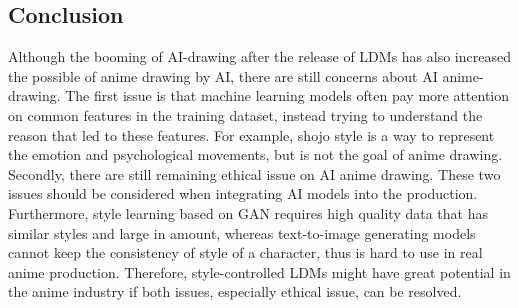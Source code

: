\subsection*{Conclusion}

Although the booming of AI-drawing after the release of LDMs has also increased
the possible of anime drawing by AI,
there are still concerns about AI anime-drawing.
The first issue is that machine learning models often pay more attention on common features
in the training dataset,
instead trying to understand the reason that led to these features.
For example, shojo style is a way to represent the emotion and psychological movements,
but is not the goal of anime drawing.
Secondly, there are still remaining ethical issue on AI anime drawing.
These two issues should be considered when integrating AI models into the production.
Furthermore, style learning based on GAN requires high quality data that has similar styles and large in amount,
whereas text-to-image generating models cannot keep the consistency of style of a character,
thus is hard to use in real anime production.
Therefore, style-controlled LDMs might have great potential in the anime industry if 
both issues, especially ethical issue, can be resolved.
